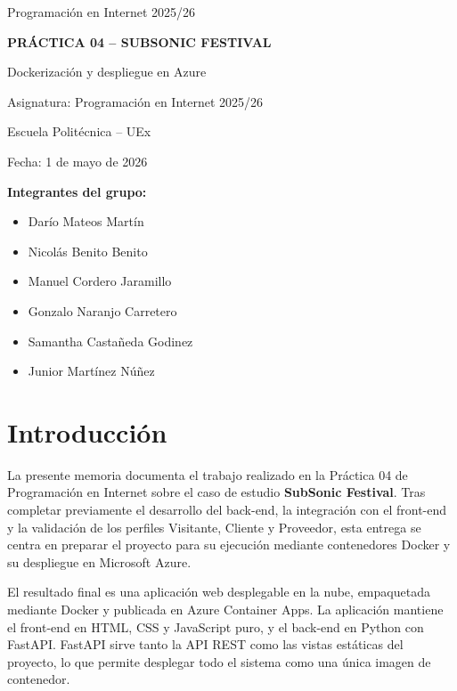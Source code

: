 \documentclass[11pt,a4paper]{article}
\begin{document}
\begin{titlepage}
\centering
{\large Programaci\'on en Internet 2025/26\par}
\vspace{2.2cm}
{\LARGE\textbf{PR\'ACTICA 04 -- SUBSONIC FESTIVAL}\par}
\vspace{0.4cm}
{\Large Dockerizaci\'on y despliegue en Azure\par}
\vspace{1.2cm}
{\large Asignatura: Programaci\'on en Internet 2025/26\par}
{\large Escuela Polit\'ecnica -- UEx\par}
\vspace{0.8cm}
{\large Fecha: 1 de mayo de 2026\par}
\vfill
\begin{flushleft}
\textbf{Integrantes del grupo:}
\begin{itemize}
  \item Dar\'io Mateos Mart\'in
  \item Nicol\'as Benito Benito
  \item Manuel Cordero Jaramillo
  \item Gonzalo Naranjo Carretero
  \item Samantha Casta\~neda Godinez
  \item Junior Mart\'inez N\'u\~nez
\end{itemize}
\end{flushleft}
\end{titlepage}

\tableofcontents
\newpage
{}

\section{Introducci\'on}

La presente memoria documenta el trabajo realizado en la Pr\'actica 04 de Programaci\'on en Internet sobre el caso de estudio \textbf{SubSonic Festival}. Tras completar previamente el desarrollo del back-end, la integraci\'on con el front-end y la validaci\'on de los perfiles Visitante, Cliente y Proveedor, esta entrega se centra en preparar el proyecto para su ejecuci\'on mediante contenedores Docker y su despliegue en Microsoft Azure.

El resultado final es una aplicaci\'on web desplegable en la nube, empaquetada mediante Docker y publicada en Azure Container Apps. La aplicaci\'on mantiene el front-end en HTML, CSS y JavaScript puro, y el back-end en Python con FastAPI. FastAPI sirve tanto la API REST como las vistas est\'aticas del proyecto, lo que permite desplegar todo el sistema como una \'unica imagen de contenedor.
\end{document}
